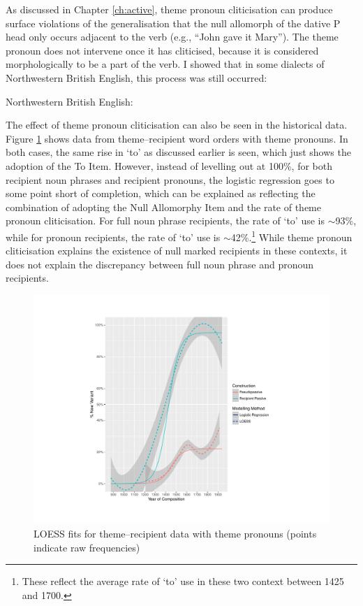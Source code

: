 	As discussed in Chapter \ref{ch:active}, theme pronoun cliticisation can produce surface violations of the generalisation that the null allomorph of the dative P head only occurs adjacent to the verb (e.g., ``John gave it Mary''). The theme pronoun does not intervene once it has cliticised, because it is considered morphologically to be a part of the verb. I showed that in some dialects of Northwestern British English, this process was still occurred:

	\begin{exe}
		 Northwestern British English:
		\begin{xlist}
	\end{xlist}
	\end{exe}

	The effect of theme pronoun cliticisation can also be seen in the historical data. Figure \ref{fig:brit-tr} shows data from theme--recipient word orders with theme pronouns. In both cases, the same rise in `to' as discussed earlier is seen, which just shows the adoption of the To Item. However, instead of levelling out at 100\%, for both recipient noun phrases and recipient pronouns, the logistic regression goes to some point short of completion, which can be explained as reflecting the combination of adopting the Null Allomorphy Item and the rate of theme pronoun cliticisation. For full noun phrase recipients, the rate of `to' use is $\sim$93\%, while for pronoun recipients, the rate of `to' use is $\sim$42\%.\footnote{These reflect the average rate of `to' use in these two context between 1425 and 1700.} While theme pronoun cliticisation explains the existence of null marked recipients in these contexts, it does not explain the discrepancy between full noun phrase and pronoun recipients.

	\begin{figure}[ht!]
		\includegraphics[width=\linewidth]{../images/brit-tp}
		\caption{LOESS fits for theme--recipient data with theme pronouns (points indicate raw frequencies)}
		\label{fig:brit-tr}
	\end{figure}

